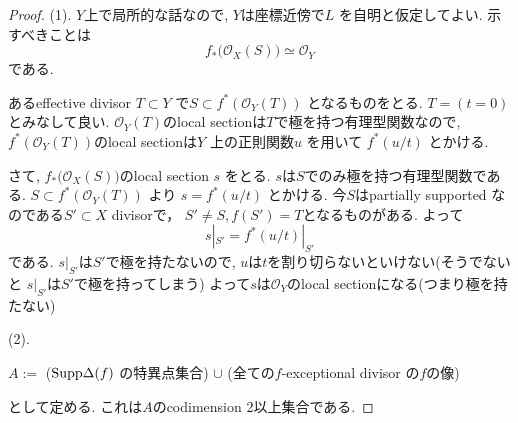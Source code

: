\documentclass[dvipdfmx,a4paper,11pt]{article} %
\theoremstyle{definition}
\theoremstyle{remark}
\numberwithin{equation}{section}
\newcommand{\Supp}{{\rm Supp}}
\begin{document}
\begin{proof}
(1). 
$Y$上で局所的な話なので, $Y$は座標近傍で\(L\) を自明と仮定してよい. 
示すべきことは 
\[ f_*\bigl(\mathcal{O}_X(S)\bigr) \simeq \mathcal{O}_Y
\] である.

あるeffective divisor \(T \subset Y\) で\(S \subset f^*(\mathcal{O}_Y(T))\) となるものをとる. 
$T=(t=0)$とみなして良い. 
$\mathcal{O}_Y(T)$のlocal sectionは$T$で極を持つ有理型関数なので, 
$f^*(\mathcal{O}_Y(T))$のlocal sectionは\(Y\) 上の正則関数\(u\) を用いて
\(f^*(u/t)\) 
とかける. 

さて, $f_*\bigl(\mathcal{O}_X(S)\bigr)$のlocal section $s$ をとる. 
$s$は$S$でのみ極を持つ有理型関数である.
 \(S \subset f^*(\mathcal{O}_Y(T))\) より
 $ s = f^*(u/t)$
 とかける. 今$S$はpartially supported なのである$S'\subset X$ divisorで，
$S ' \neq S, f(S')=T$となるものがある. 
 よって
 $$
 s|_{S'} = f^*(u/t)|_{S'}
 $$
 である. 
$ s|_{S'}$は$S'$で極を持たないので, $u$は$t$を割り切らないといけない(そうでないと $s|_{S'}$は$S'$で極を持ってしまう)
よって$s$は$\mathcal{O}_Y$のlocal sectionになる(つまり極を持たない)

(2). 
\begin{center}
$A :=$
 (\(\Supp \Delta(f)\) の特異点集合) $\cup$
(全ての\(f\)-exceptional divisor の$f$の像)
\end{center}
として定める. これは$A$のcodimension 2以上集合である.



\end{proof}
\end{document}
